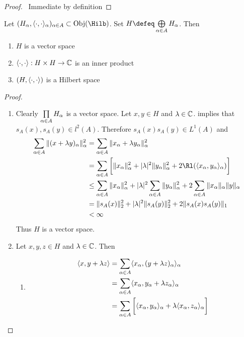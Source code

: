 \documentclass{book}
\begin{document}
\begin{proof}\
	Immediate by definition
\end{proof}

\begin{ex}
	Let $(H_\al, \l \cdot, \cdot \r_{\al})_{\al \in A} \subset \Obj(\Hilb)$. Set $H \defeq \bigoplus\limits_{\al \in A} H_{\al}$. Then
	\begin{enumerate}
		\item $H$ is a vector space
		\item $\langle \cdot, \cdot\rangle: H \times H \rightarrow \mathbb{C}$ is an inner product
		\item $(H, \langle \cdot, \cdot \rangle)$ is a Hilbert space
	\end{enumerate}
\end{ex}

\begin{proof}\
	\begin{enumerate}
		\item Clearly $\prod\limits_{\alpha \in A} H_{\alpha}$ is a vector space. Let $x,y \in H$ and $\lambda \in \mathbb{C}$.  implies that $s_A(x), s_A(y) \in l^2(A)$. Therefore $s_A(x) s_A(y) \in L^1(A)$ and
		\begin{align*}
			\sum\limits_{\al \in A}\|(x + \lam y)_{\al}\|_{\al}^2
			& = \sum\limits_{\al \in A}\|x_{\al} + \lam y_{\al}\|_{\al}^2 \\
			& = \sum\limits_{\al \in A} \bigg[ \|x_{\al}\|_{\al}^2 + |\lam|^2 \|y_{\al}\|_{\al}^2 + 2 \Rl(\l x_{\al}, y_{\al} \r_{\al}) \bigg] \\
			& \leq \sum\limits_{\al \in A} \|x_{\al}\|_{\al}^2 + |\lam|^2 \sum\limits_{\al \in A} \|y_{\al}\|_{\al}^2 + 2\sum\limits_{\al \in A} \| x_{\al}\|_{\al} \|y \|_{\al}  \\
			& = \|s_A(x)\|_2^2 + |\lam|^2 \|s_A(y)\|_2^2 + 2 \|s_A(x) s_A(y)\|_1 \\
			& < \infty 
		\end{align*}
		Thus $H$ is a vector space.
		\item Let $x,y,z \in H$ and $\lambda \in \mathbb{C}$. Then 
		\begin{enumerate}
			\item 
			\begin{align*}
				\l x, y + \lam z \r
				& = \sum\limits_{\al \in A} \l x_{\al}, (y + \lam z)_{\al} \r_{\al} \\
				& = \sum\limits_{\al \in A} \l x_{\al}, y_{\al} + \lam z_{\al} \r_{\al} \\
				& = \sum\limits_{\al \in A} \bigg[ \l x_{\al}, y_{\al} \r_{\al} + \lam \l x_{\al}, z_{\al} \r_{\al} \bigg] \\

\end{align*}
\end{enumerate}
\end{enumerate}
\end{proof}
\end{document}
